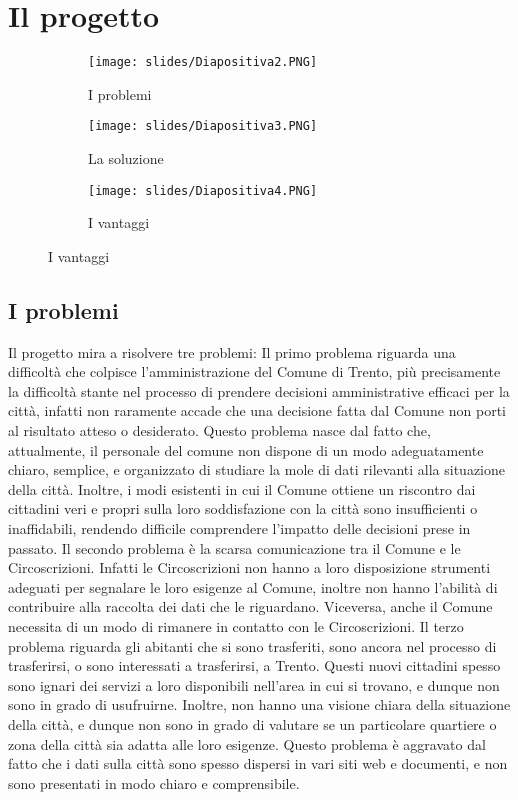 \chapter{Il progetto \ProjectTitle}
\begin{figure}[H]
    \begin{subfigure}{0.33\textwidth}
        \texttt{[image: slides/Diapositiva2.PNG]}
        \caption{I problemi}
    \end{subfigure}
    \begin{subfigure}{0.33\textwidth}
        \texttt{[image: slides/Diapositiva3.PNG]}
        \caption{La soluzione}
    \end{subfigure}
    \begin{subfigure}{0.33\textwidth}
        \texttt{[image: slides/Diapositiva4.PNG]}
        \caption{I vantaggi}
    \end{subfigure}
\end{figure}

\section{I problemi}
    Il progetto mira a risolvere tre problemi:\newline
    Il primo problema riguarda una difficoltà che colpisce l'amministrazione del Comune di Trento, più precisamente la difficoltà stante nel processo di prendere decisioni amministrative efficaci per la città, infatti non raramente accade che una decisione fatta dal Comune non porti al risultato atteso o desiderato. Questo problema nasce dal fatto che, attualmente, il personale del comune non dispone di un modo adeguatamente chiaro, semplice, e organizzato di studiare la mole di dati rilevanti alla situazione della città. Inoltre, i modi esistenti in cui il Comune ottiene un riscontro dai cittadini veri e propri sulla loro soddisfazione con la città sono insufficienti o inaffidabili, rendendo difficile comprendere l'impatto delle decisioni prese in passato. \newline
    Il secondo problema è la scarsa comunicazione tra il Comune e le Circoscrizioni. Infatti le Circoscrizioni non hanno a loro disposizione strumenti adeguati per segnalare le loro esigenze al Comune, inoltre non hanno l'abilità di contribuire alla raccolta dei dati che le riguardano. Viceversa, anche il Comune necessita di un modo di rimanere in contatto con le Circoscrizioni.\newline
    Il terzo problema riguarda gli abitanti che si sono trasferiti, sono ancora nel processo di trasferirsi, o sono interessati a trasferirsi, a Trento. Questi nuovi cittadini spesso sono ignari dei servizi a loro disponibili nell'area in cui si trovano, e dunque non sono in grado di usufruirne. Inoltre, non hanno una visione chiara della situazione della città, e dunque non sono in grado di valutare se un particolare quartiere o zona della città sia adatta alle loro esigenze. Questo problema è aggravato dal fatto che i dati sulla città sono spesso dispersi in vari siti web e documenti, e non sono presentati in modo chiaro e comprensibile.
